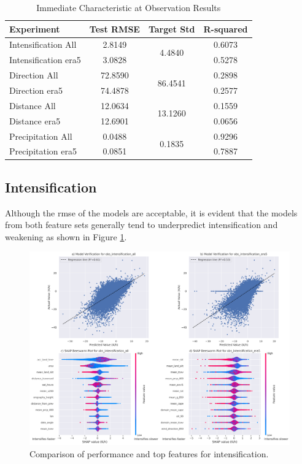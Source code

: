 \begin{table}[h!]
\centering
\caption{Immediate Characteristic at Observation Results}
\label{tab:obs_experiment_results}
\begin{tabular}{lccc}
\hline
\textbf{Experiment} & \textbf{Test RMSE} & \textbf{Target Std} & \textbf{R-squared} \\
\hline
Intensification All     & 2.8149  & \multirow{2}{*}{4.4840}  & 0.6073 \\
Intensification \acrshort{era5}    & 3.0828  & & 0.5278 \\
Direction All     & 72.8590 & \multirow{2}{*}{86.4541} & 0.2898 \\
Direction \acrshort{era5}     & 74.4878 & & 0.2577 \\
Distance All      & 12.0634 & \multirow{2}{*}{13.1260} & 0.1559 \\
Distance \acrshort{era5}     & 12.6901 & & 0.0656 \\
Precipitation All       & 0.0488  & \multirow{2}{*}{0.1835}  & 0.9296 \\
Precipitation \acrshort{era5}      & 0.0851  & & 0.7887 \\
\hline
\end{tabular}
\end{table}

\clearpage
\subsection{Intensification}

Although the \acrshort{rmse} of the models are acceptable, it is evident that the models from both feature sets generally tend to underpredict intensification and weakening as shown in Figure \ref{fig:obs_intensification_summary}.

\begin{figure}[ht]
    \centering
    \includegraphics[width=\textwidth]{../figures/generated/experiments/obs_intensification/obs_intensification_summary.png}
    \caption{Comparison of performance and top features for intensification.}
    \label{fig:obs_intensification_summary}
\end{figure}


